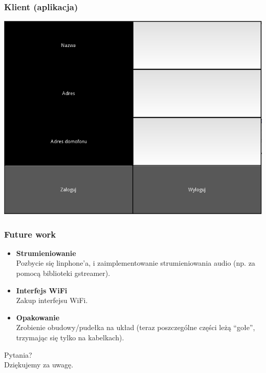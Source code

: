 \documentclass[presentation, 10pt]{beamer}
\begin{document}
\begin{frame}
\frametitle{Klient (aplikacja)}
\label{sec-3-4}

\includegraphics[width=.9\linewidth]{client.png}
\end{frame}
\begin{frame}
\frametitle{Future work}
\label{sec-3-5}

\begin{itemize}
\item \textbf{Strumieniowanie} \\
Pozbycie się linphone'a, i zaimplementowanie strumieniowania audio (np. za pomocą biblioteki gstreamer).
\item \textbf{Interfejs WiFi} \\
Zakup interfejsu WiFi.
\item \textbf{Opakowanie} \\
Zrobienie obudowy/pudełka na układ (teraz poszczególne części leżą ``gołe'', trzymając się tylko na kabelkach).
\end{itemize}
\end{frame}
\label{sec-4}
\begin{frame}

  \begin{center}
    \large{
      Pytania?
      \\ 
      \vfill
      Dziękujemy za uwagę.
    }
    \vspace{1em}
  \end{center}
\end{frame}
\end{document}
